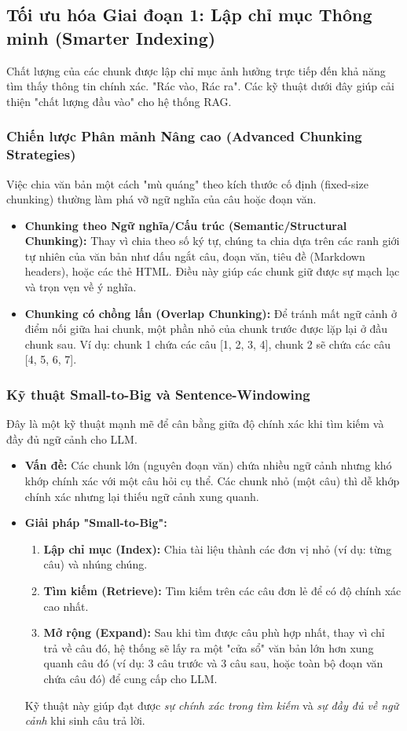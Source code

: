 \subsection{Tối ưu hóa Giai đoạn 1: Lập chỉ mục Thông minh (Smarter Indexing)}
\label{ssec:smarter_indexing}
Chất lượng của các chunk được lập chỉ mục ảnh hưởng trực tiếp đến khả năng tìm thấy thông tin chính xác. "Rác vào, Rác ra". Các kỹ thuật dưới đây giúp cải thiện "chất lượng đầu vào" cho hệ thống RAG.

\subsubsection{Chiến lược Phân mảnh Nâng cao (Advanced Chunking Strategies)}
Việc chia văn bản một cách "mù quáng" theo kích thước cố định (fixed-size chunking) thường làm phá vỡ ngữ nghĩa của câu hoặc đoạn văn.
\begin{itemize}
    \item \textbf{Chunking theo Ngữ nghĩa/Cấu trúc (Semantic/Structural Chunking):} Thay vì chia theo số ký tự, chúng ta chia dựa trên các ranh giới tự nhiên của văn bản như dấu ngắt câu, đoạn văn, tiêu đề (Markdown headers), hoặc các thẻ HTML. Điều này giúp các chunk giữ được sự mạch lạc và trọn vẹn về ý nghĩa.
    \item \textbf{Chunking có chồng lấn (Overlap Chunking):} Để tránh mất ngữ cảnh ở điểm nối giữa hai chunk, một phần nhỏ của chunk trước được lặp lại ở đầu chunk sau. Ví dụ: chunk 1 chứa các câu [1, 2, 3, 4], chunk 2 sẽ chứa các câu [4, 5, 6, 7].
\end{itemize}

\subsubsection{Kỹ thuật Small-to-Big và Sentence-Windowing}
Đây là một kỹ thuật mạnh mẽ để cân bằng giữa độ chính xác khi tìm kiếm và đầy đủ ngữ cảnh cho LLM.
\begin{itemize}
    \item \textbf{Vấn đề:} Các chunk lớn (nguyên đoạn văn) chứa nhiều ngữ cảnh nhưng khó khớp chính xác với một câu hỏi cụ thể. Các chunk nhỏ (một câu) thì dễ khớp chính xác nhưng lại thiếu ngữ cảnh xung quanh.
    \item \textbf{Giải pháp "Small-to-Big":}
    \begin{enumerate}
        \item \textbf{Lập chỉ mục (Index):} Chia tài liệu thành các đơn vị nhỏ (ví dụ: từng câu) và nhúng chúng.
        \item \textbf{Tìm kiếm (Retrieve):} Tìm kiếm trên các câu đơn lẻ để có độ chính xác cao nhất.
        \item \textbf{Mở rộng (Expand):} Sau khi tìm được câu phù hợp nhất, thay vì chỉ trả về câu đó, hệ thống sẽ lấy ra một "cửa sổ" văn bản lớn hơn xung quanh câu đó (ví dụ: 3 câu trước và 3 câu sau, hoặc toàn bộ đoạn văn chứa câu đó) để cung cấp cho LLM.
    \end{enumerate}
    Kỹ thuật này giúp đạt được \textit{sự chính xác trong tìm kiếm} và \textit{sự đầy đủ về ngữ cảnh} khi sinh câu trả lời.
\end{itemize}

